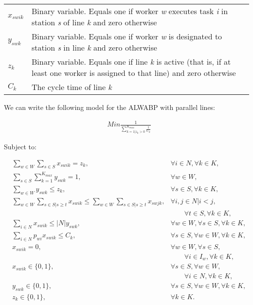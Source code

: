 \documentclass{singlecol-new}
\begin{document}
\begin{tabular}[t]{lp{10cm}}
$x_{swik}$ & Binary variable. Equals one if worker \textit{w} executes task \textit{i} in station \textit{s} of line \textit{k} and zero otherwise \\
$y_{swk}$ & Binary variable. Equals one if worker \textit{w} is designated to station \textit{s} in line \textit{k} and zero otherwise\\
$z_k$ & Binary variable. Equals one if line \textit{k} is active (that is, if at least one worker is assigned to that line) and zero otherwise \\
$C_k$ & The cycle time of line \textit{k}\\
\end{tabular}

\vspace{0.2cm}


We can write the following model for the ALWABP with parallel lines:

\begin{align}
& \displaystyle Min \frac{1}{\sum_{k = 1 | z_k > 0}^{K_{max}}\frac{1}{C_k}}\label{eq5:objetivo0}
\end{align}

Subject to:

\begin{align}
& \displaystyle\sum_{w \in W} \sum_{s \in S} x_{swik} = z_k, & \forall i \in N, \forall k \in K, \label{eq5:garante_execucao}\\
& \displaystyle\sum_{s \in S} \sum_{k = 1}^{K_{max}} y_{swk} = 1, & \forall w \in W, \label{eq5:biunivoco1} \\
& \displaystyle\sum_{w \in W} y_{swk} \leq z_k, & \forall s \in S, \forall k \in K, \label{eq5:biunivoco2} \\
& \displaystyle\sum_{w \in W} \sum_{s \in S | s \geq t} x_{swik} \leq \sum_{w \in W} \sum_{s \in S | s \geq t} x_{swjk}, & \forall i,j \in N | i<j,\label{eq5:precedencia}\\
&\qquad &\qquad \forall t \in S, \forall k \in K, \nonumber\\
& \displaystyle\sum_{i \in N} x_{swik} \leq |N| y_{swk}, & \forall w \in W, \forall s \in S, \forall k \in K, \label{eq5:relacao_trabalhador_estagio}\\
& \displaystyle \sum_{i \in N} p_{wi}x_{swik} \leq C_{k}, & \forall s \in S, \forall w \in W, \forall k \in K, \label{eq5:define_frequencia}\\
& \displaystyle x_{swik} = 0, & \forall w \in W, \forall s \in S,\label{eq5:incompativeis}\\
&\qquad &\qquad \forall i \in I_w, \forall k \in K, \nonumber\\
& \displaystyle x_{swik} \in \{0, 1\}, & \forall s \in S, \forall w \in W, \label{eq5:var1}\\
&\qquad &\qquad \forall i \in N, \forall k \in K, \nonumber\\
& \displaystyle y_{swk} \in \{0, 1\}, & \forall s \in S, \forall w \in W, \forall k \in K, \label{eq5:var2}\\
& \displaystyle z_k \in \{0, 1\}, & \forall k \in K. \label{eq5:var3}
\end{align}
\end{document}

